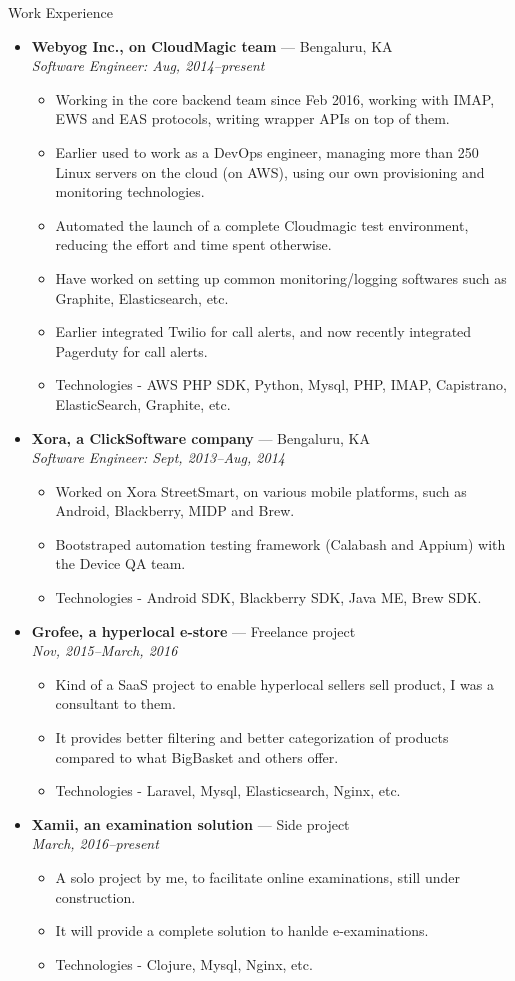 \documentclass[a4paper,11pt,oneside]{article}
\newenvironment{ressection}[1]{
  \vspace{4pt}
         {\fontfamily{phv}\selectfont\Large#1}
         \begin{itemize}
           \vspace{3pt}
}{
         \end{itemize}
}
\newcommand{\ressubitem}[1]{
  \vspace{-1pt}
\item \begin{flushleft} #1 \end{flushleft}
}
\newcommand{\resbigitem}[3]{
  \vspace{-5pt}
\item
  \textbf{#1} --- #2 \\
  \textit{#3}
}
\newenvironment{ressubsec}[3]{
  \resbigitem{#1}{#2}{#3}
  \vspace{-2pt}
  \begin{itemize}
}{
  \end{itemize}
}
\begin{document}
\begin{ressection}{Work Experience}
  \begin{ressubsec}{Webyog Inc., on CloudMagic team}{Bengaluru, KA}{Software Engineer: Aug, 2014--present}
    \ressubitem{Working in the core backend team since Feb 2016, working with IMAP, EWS and EAS protocols, writing wrapper APIs on top of them.}
    \ressubitem{Earlier used to work as a DevOps engineer, managing more than 250 Linux servers on the cloud (on AWS), using our own provisioning and monitoring technologies.}
    \ressubitem{Automated the launch of a complete Cloudmagic test environment, reducing the effort and time spent otherwise.}
    \ressubitem{Have worked on setting up common monitoring/logging softwares such as Graphite, Elasticsearch, etc.}
    \ressubitem{Earlier integrated Twilio for call alerts, and now recently integrated Pagerduty for call alerts.}
    \ressubitem{Technologies - AWS PHP SDK, Python, Mysql, PHP, IMAP, Capistrano, ElasticSearch, Graphite, etc.}
  \end{ressubsec}
  \begin{ressubsec}{Xora, a ClickSoftware company}{Bengaluru, KA}{Software Engineer: Sept, 2013--Aug, 2014}
    \ressubitem{Worked on Xora StreetSmart, on various mobile platforms, such as Android, Blackberry, MIDP and Brew.}
    \ressubitem{Bootstraped automation testing framework (Calabash and Appium) with the Device QA team.}
    \ressubitem{Technologies - Android SDK, Blackberry SDK, Java ME, Brew SDK.}
  \end{ressubsec}
  \begin{ressubsec}{Grofee, a hyperlocal e-store}{Freelance project}{Nov, 2015--March, 2016}
    \ressubitem{Kind of a SaaS project to enable hyperlocal sellers sell product, I was a consultant to them.}
    \ressubitem{It provides better filtering and better categorization of products compared to what BigBasket and others offer.}
    \ressubitem{Technologies - Laravel, Mysql, Elasticsearch, Nginx, etc.}
  \end{ressubsec}
  \begin{ressubsec}{Xamii, an examination solution}{Side project}{March, 2016--present}
    \ressubitem{A solo project by me, to facilitate online examinations, still under construction.}
    \ressubitem{It will provide a complete solution to hanlde e-examinations.}
    \ressubitem{Technologies - Clojure, Mysql, Nginx, etc.}
  \end{ressubsec}

\end{ressection}
\end{document}
